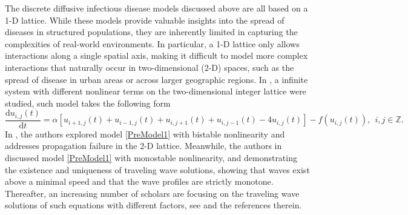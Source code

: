 \documentclass[final,3p,times]{elsarticle}
\numberwithin{equation}{section}
\begin{document}
The discrete diffusive infectious disease models discussed above are all based on a 1-D lattice. While these models provide valuable insights into the spread of diseases in structured populations, they are inherently limited in capturing the complexities of real-world environments. In particular, a 1-D lattice only allows interactions along a single spatial axis, making it difficult to model more complex interactions that naturally occur in two-dimensional (2-D) spaces, such as the spread of disease in urban areas or across larger geographic regions. In \cite{VleckParetCahnSIAP1998,GuoWuOJM2008}, a infinite system with different nonlinear terms on the two-dimensional integer lattice were studied, such model takes the following form
\begin{equation}\label{PreModel1}
\frac{\textrm{d} u_{i,j}(t)}{\textrm{d} t} = \alpha \left[u_{i+1,j}(t)+u_{i-1,j}(t)+u_{i,j+1}(t)+u_{i,j-1}(t)-4u_{i,j}(t)\right] - f(u_{i,j}(t)),\ \ i,j\in \mathds{Z}.
\end{equation}
In \cite{VleckParetCahnSIAP1998}, the authors explored model \eqref{PreModel1} with bistable nonlinearity and addresses propagation failure in the 2-D lattice. Meanwhile, the authors in \cite{GuoWuOJM2008} discussed model \eqref{PreModel1} with monostable nonlinearity, and demonstrating the existence and uniqueness of traveling wave solutions, showing that waves exist above a minimal speed and that the wave profiles are strictly monotone. Thereafter, an increasing number of scholars are focusing on the traveling wave solutions of such equations with different factors, see \cite{ChengLiWangIMAJAM2008,ChengLiWangDCDSB2010,YuZhangWangMCM2013,XuJDE2020} and the references therein. 

\end{document}
